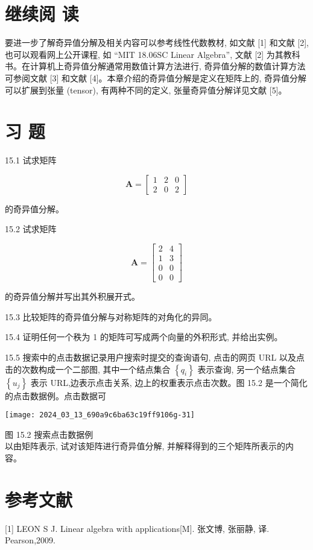 \documentclass[10pt]{article}
\begin{document}
\section*{继续阅 读}
要进一步了解奇异值分解及相关内容可以参考线性代数教材, 如文献 [1] 和文献 [2], 也可以观看网上公开课程, 如 “MIT 18.06SC Linear Algebra”, 文献 [2] 为其教科书。在计算机上奇异值分解通常用数值计算方法进行, 奇异值分解的数值计算方法可参阅文献 [3] 和文献 [4]。本章介绍的奇异值分解是定义在矩阵上的, 奇异值分解可以扩展到张量 (tensor), 有两种不同的定义, 张量奇异值分解详见文献 [5]。

\section*{习 题}
15.1 试求矩阵

$$
\boldsymbol{A}=\left[\begin{array}{lll}
1 & 2 & 0 \\
2 & 0 & 2
\end{array}\right]
$$

的奇异值分解。

15.2 试求矩阵

$$
\boldsymbol{A}=\left[\begin{array}{ll}
2 & 4 \\
1 & 3 \\
0 & 0 \\
0 & 0
\end{array}\right]
$$

的奇异值分解并写出其外积展开式。

15.3 比较矩阵的奇异值分解与对称矩阵的对角化的异同。

15.4 证明任何一个秩为 1 的矩阵可写成两个向量的外积形式, 并给出实例。

15.5 搜索中的点击数据记录用户搜索时提交的查询语句, 点击的网页 URL 以及点击的次数构成一个二部图, 其中一个结点集合 $\left\{q_{i}\right\}$ 表示查询, 另一个结点集合 $\left\{u_{j}\right\}$ 表示 URL,边表示点击关系, 边上的权重表示点击次数。图 15.2 是一个简化的点击数据例。点击数据可

\begin{center}
\texttt{[image: 2024\_03\_13\_690a9c6ba63c19ff9106g-31]}
\end{center}

图 15.2 搜索点击数据例\\
以由矩阵表示, 试对该矩阵进行奇异值分解, 并解释得到的三个矩阵所表示的内容。

\section*{参考文献}
[1] LEON S J. Linear algebra with applications[M]. 张文博, 张丽静, 译. Pearson,2009.
\end{document}
